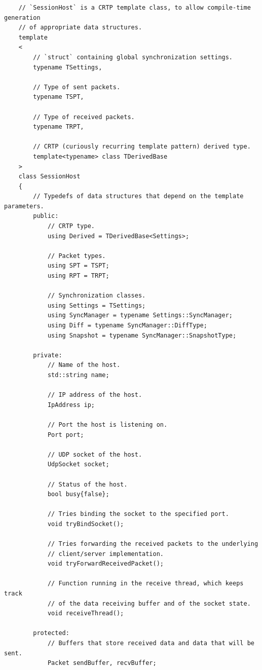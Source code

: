 \documentclass{report}
\begin{document}
\begin{verbatim}
    // `SessionHost` is a CRTP template class, to allow compile-time generation 
    // of appropriate data structures.
    template
    <
        // `struct` containing global synchronization settings.
        typename TSettings, 
        
        // Type of sent packets.
        typename TSPT, 
        
        // Type of received packets.
        typename TRPT, 

        // CRTP (curiously recurring template pattern) derived type.
        template<typename> class TDerivedBase
    > 
    class SessionHost
    {
        // Typedefs of data structures that depend on the template parameters.
        public:
            // CRTP type.
            using Derived = TDerivedBase<Settings>;

            // Packet types.
            using SPT = TSPT;
            using RPT = TRPT;
        
            // Synchronization classes.
            using Settings = TSettings;
            using SyncManager = typename Settings::SyncManager;
            using Diff = typename SyncManager::DiffType;
            using Snapshot = typename SyncManager::SnapshotType;

        private:
            // Name of the host.
            std::string name;
            
            // IP address of the host.
            IpAddress ip;

            // Port the host is listening on.
            Port port;

            // UDP socket of the host.
            UdpSocket socket;

            // Status of the host.
            bool busy{false};

            // Tries binding the socket to the specified port.
            void tryBindSocket();    

            // Tries forwarding the received packets to the underlying 
            // client/server implementation.
            void tryForwardReceivedPacket();
            
            // Function running in the receive thread, which keeps track
            // of the data receiving buffer and of the socket state.
            void receiveThread();

        protected:
            // Buffers that store received data and data that will be sent.
            Packet sendBuffer, recvBuffer;


\end{verbatim}
\end{document}
